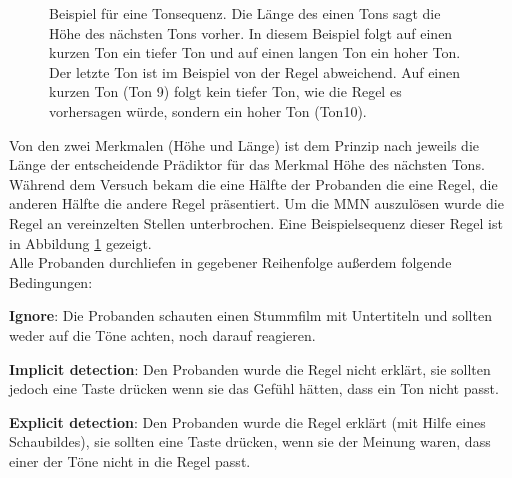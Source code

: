 \documentclass[doc,a4paper,12pt]{apa6}
\begin{document}
\begin{figure}[t]
  \centering
  \begin{minipage}{\textwidth}
    \setlength{\fboxsep}{.05\textwidth}
    \vspace{10pt}
    \caption{Beispiel für eine Tonsequenz. Die Länge des einen Tons sagt die Höhe des nächsten Tons vorher. In diesem Beispiel folgt auf einen kurzen Ton ein tiefer Ton und auf einen langen Ton ein hoher Ton. Der letzte Ton ist im Beispiel von der Regel abweichend. Auf einen kurzen Ton (Ton 9) folgt kein tiefer Ton, wie die Regel es vorhersagen würde, sondern ein hoher Ton (Ton10).}
    \label{stimuli}
  \end{minipage}
\end{figure}

Von den zwei Merkmalen (Höhe und Länge) ist dem Prinzip nach jeweils die Länge der entscheidende Prädiktor für das Merkmal Höhe des nächsten Tons. Während dem Versuch bekam die eine Hälfte der Probanden die eine Regel, die anderen Hälfte die andere Regel präsentiert. Um die MMN auszulösen wurde die Regel an vereinzelten Stellen unterbrochen. Eine Beispielsequenz dieser Regel ist in Abbildung \ref{stimuli} gezeigt.\\
Alle Probanden durchliefen in gegebener Reihenfolge außerdem folgende Bedingungen:

\begin{compactitem}
  \item \textbf{Ignore}: Die Probanden schauten einen Stummfilm mit Untertiteln und sollten weder auf die Töne achten, noch darauf reagieren.
  \item \textbf{Implicit detection}: Den Probanden wurde die Regel nicht erklärt, sie sollten jedoch eine Taste drücken wenn sie das Gefühl hätten, dass ein Ton nicht passt.
  \item \textbf{Explicit detection}: Den Probanden wurde die Regel erklärt (mit Hilfe eines Schaubildes), sie sollten eine Taste drücken, wenn sie der Meinung waren, dass einer der Töne nicht in die Regel passt.
\end{compactitem}
\end{document}
